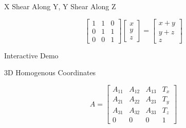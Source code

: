 \documentclass{beamer}
\begin{document}
\begin{frame}{X Shear Along Y, Y Shear Along Z}

\[ \left[ \begin{array}{ccc} 1 & 1 & 0\\ 0 & 1 & 1 \\ 0 & 0 & 1 \end{array} \right] \left[ \begin{array}{c} x \\ y \\ z \end{array} \right] =  \left[ \begin{array}{c} x + y \\ y + z \\ z \end{array} \right] \]

Interactive Demo

\end{frame}


\begin{frame}{3D Homogenous Coordinates}

\[ A = \left[
\begin{array}{cccc}
A_{11} & A_{12} & A_{13} & T_x \\
A_{21} & A_{22} & A_{23} & T_y \\
A_{31} & A_{32} & A_{33} & T_z \\ 
0 & 0 & 0 & 1
\end{array}
\right]
\]


\end{frame}
\end{document}
